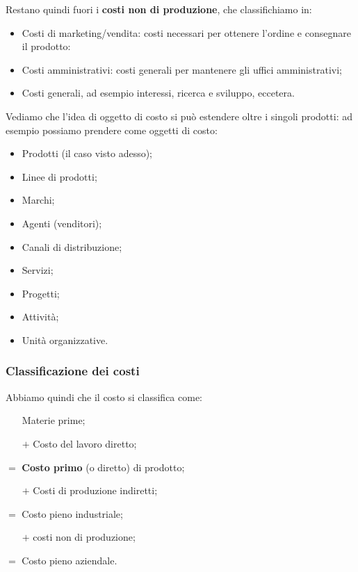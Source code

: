 \documentclass[a4paper,11pt]{article}
\begin{document}
Restano quindi fuori i \textbf{costi non di produzione}, che classifichiamo in:
\begin{itemize}
	\item Costi di marketing/vendita: costi necessari per ottenere l'ordine e consegnare il prodotto:
	\item Costi amministrativi: costi generali per mantenere gli uffici amministrativi;
	\item Costi generali, ad esempio interessi, ricerca e sviluppo, eccetera.
\end{itemize}

\par\smallskip

Vediamo che l'idea di oggetto di costo si può estendere oltre i singoli prodotti: ad esempio possiamo prendere come oggetti di costo:
\begin{itemize}
	\item Prodotti (il caso visto adesso);
	\item Linee di prodotti;
	\item Marchi;
	\item Agenti (venditori);
	\item Canali di distribuzione;
	\item Servizi;
	\item Progetti;
	\item Attività;
	\item Unità organizzative.
\end{itemize}

\subsubsection{Classificazione dei costi}

Abbiamo quindi che il costo si classifica come:
\begin{itemize}
	\begin{itemize}
		\item[] Materie prime;
		\item[$+$] Costo del lavoro diretto;
	\end{itemize}
	$=$ \textbf{Costo primo} (o diretto) di prodotto;
	\begin{itemize}
		\item[$+$] Costi di produzione indiretti;
	\end{itemize}
	$=$ Costo pieno industriale;
	\begin{itemize}
		\item[$+$] costi non di produzione;
	\end{itemize}
	$=$ Costo pieno aziendale.
\end{itemize}
\end{document}
